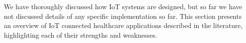 

We have thoroughly discussed how \acs{IoT} systems are designed, but so far we have not discussed details of any specific implementation so far. This section presents an overview of \acs{IoT} connected healthcare applications described in the literature, highlighting each of their strengths and weaknesses. \bigskip
%

